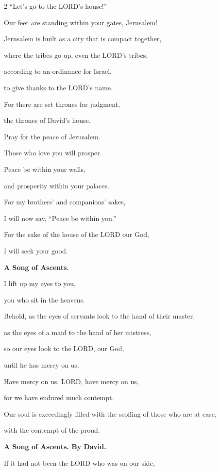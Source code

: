 \begin{multicols}{2}
	“Let’s go to the LORD’s house!”
	
	
	\myverse{}Our feet are standing within your gates, Jerusalem!
	
	
	\myverse{}Jerusalem is built as a city that is compact together,
	
	
	\myverse{}where the tribes go up, even the LORD’s tribes,
	
	according to an ordinance for Israel,
	
	to give thanks to the LORD’s name.
	
	
	\myverse{}For there are set thrones for judgment,
	
	the thrones of David’s house.
	
	
	\myverse{}Pray for the peace of Jerusalem.
	
	Those who love you will prosper.
	
	
	\myverse{}Peace be within your walls,
	
	and prosperity within your palaces.
	
	
	\myverse{}For my brothers’ and companions’ sakes,
	
	I will now say, “Peace be within you.”
	
	
	\myverse{}For the sake of the house of the LORD our God,
	
	I will seek your good.
	
	
	\mychapter{}\textbf{A Song of Ascents.}
	
	\quad\quad\quad \myverse*{}I lift up my eyes to you,
	
	you who sit in the heavens.
	
	
	\myverse{}Behold, as the eyes of servants look to the hand of their master,
	
	as the eyes of a maid to the hand of her mistress,
	
	so our eyes look to the LORD, our God,
	
	until he has mercy on us.
	
	
	\myverse{}Have mercy on us, LORD, have mercy on us,
	
	for we have endured much contempt.
	
	
	\myverse{}Our soul is exceedingly filled with the scoffing of those who
	are at ease,
	
	with the contempt of the proud.
	
	
	\mychapter{}\textbf{A Song of Ascents. By David.}
	
	\quad\quad\quad \myverse*{}If it had not been the LORD who was on our side,
	

\end{multicols}
